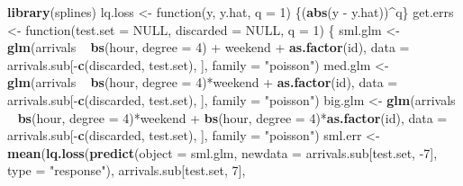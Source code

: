 \documentclass[]{article}
\newenvironment{Shaded}{\begin{snugshade}}{\end{snugshade}}
\newcommand{\KeywordTok}[1]{\textcolor[rgb]{0.13,0.29,0.53}{\textbf{{#1}}}}
\newcommand{\DataTypeTok}[1]{\textcolor[rgb]{0.13,0.29,0.53}{{#1}}}
\newcommand{\DecValTok}[1]{\textcolor[rgb]{0.00,0.00,0.81}{{#1}}}
\newcommand{\StringTok}[1]{\textcolor[rgb]{0.31,0.60,0.02}{{#1}}}
\newcommand{\OtherTok}[1]{\textcolor[rgb]{0.56,0.35,0.01}{{#1}}}
\newcommand{\NormalTok}[1]{{#1}}
\begin{document}
\begin{Shaded}
\begin{Highlighting}[]
\KeywordTok{library}\NormalTok{(splines)}
\NormalTok{lq.loss <-}\StringTok{ }\NormalTok{function(y, y.hat, }\DataTypeTok{q =} \DecValTok{1}\NormalTok{) \{(}\KeywordTok{abs}\NormalTok{(y -}\StringTok{ }\NormalTok{y.hat))^q\}}
\NormalTok{get.errs <-}\StringTok{ }\NormalTok{function(}\DataTypeTok{test.set =} \OtherTok{NULL}\NormalTok{,}
                     \DataTypeTok{discarded =} \OtherTok{NULL}\NormalTok{,}
                     \DataTypeTok{q =} \DecValTok{1}\NormalTok{) \{}
    \NormalTok{sml.glm <-}\StringTok{ }\KeywordTok{glm}\NormalTok{(arrivals ~}
\StringTok{                   }\KeywordTok{bs}\NormalTok{(hour, }\DataTypeTok{degree =} \DecValTok{4}\NormalTok{)}
                   \NormalTok{+}\StringTok{ }\NormalTok{weekend}
                   \NormalTok{+}\StringTok{ }\KeywordTok{as.factor}\NormalTok{(id),}
                   \DataTypeTok{data =} \NormalTok{arrivals.sub[-}\KeywordTok{c}\NormalTok{(discarded, test.set), ],}
                   \DataTypeTok{family =} \StringTok{"poisson"}\NormalTok{)}
    \NormalTok{med.glm <-}\StringTok{ }\KeywordTok{glm}\NormalTok{(arrivals ~}
\StringTok{                   }\KeywordTok{bs}\NormalTok{(hour, }\DataTypeTok{degree =} \DecValTok{4}\NormalTok{)*weekend}
                   \NormalTok{+}\StringTok{ }\KeywordTok{as.factor}\NormalTok{(id),}
                   \DataTypeTok{data =} \NormalTok{arrivals.sub[-}\KeywordTok{c}\NormalTok{(discarded, test.set), ],}
                   \DataTypeTok{family =} \StringTok{"poisson"}\NormalTok{)}
    \NormalTok{big.glm <-}\StringTok{ }\KeywordTok{glm}\NormalTok{(arrivals ~}
\StringTok{                   }\KeywordTok{bs}\NormalTok{(hour, }\DataTypeTok{degree =} \DecValTok{4}\NormalTok{)*weekend}
                   \NormalTok{+}\StringTok{ }\KeywordTok{bs}\NormalTok{(hour, }\DataTypeTok{degree =} \DecValTok{4}\NormalTok{)*}\KeywordTok{as.factor}\NormalTok{(id),}
                   \DataTypeTok{data =} \NormalTok{arrivals.sub[-}\KeywordTok{c}\NormalTok{(discarded, test.set), ],}
                   \DataTypeTok{family =} \StringTok{"poisson"}\NormalTok{)}
    \NormalTok{sml.err <-}\StringTok{ }\KeywordTok{mean}\NormalTok{(}\KeywordTok{lq.loss}\NormalTok{(}\KeywordTok{predict}\NormalTok{(}\DataTypeTok{object =} \NormalTok{sml.glm,}
                                    \DataTypeTok{newdata =} \NormalTok{arrivals.sub[test.set, -}\DecValTok{7}\NormalTok{],}
                                    \DataTypeTok{type =} \StringTok{"response"}\NormalTok{),}
                            \NormalTok{arrivals.sub[test.set, }\DecValTok{7}\NormalTok{],}

\end{Highlighting}
\end{Shaded}
\end{document}
